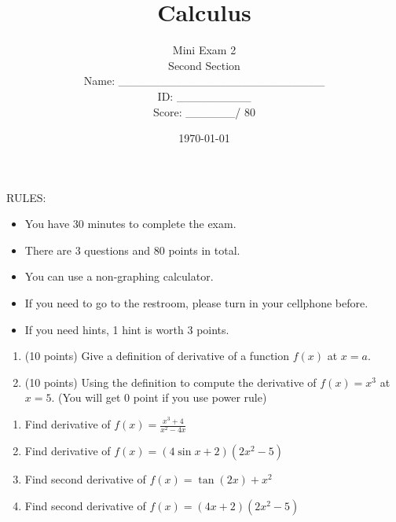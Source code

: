 \documentclass[12pt]{amsart}
\title{ Calculus }
\author{  Mini Exam 2 \\ Second Section \\ \vspace{1cm} Name: \_\_\_\_\_\_\_\_\_\_\_\_\_\_\_\_\_\_\_\_\_\_\_\_\_  
\\ \vspace{1cm} ID: \_\_\_\_\_\_\_\_\_ \\ \vspace{1cm} Score: \_\_\_\_\_\_/ 80}
\date{\today}
\begin{document}
\maketitle


RULES:
\begin{itemize}
	\item You have 30 minutes to complete the exam.
	\item There are 3 questions and 80 points in total.
	\item You can use a non-graphing calculator.
	\item If you need to go to the restroom, please turn in your cellphone before.
	\item If you need hints, 1 hint is worth 3 points.
\end{itemize}


\newpage

\begin{problem}[20 points]
\begin{enumerate}
	\item (10 points) Give a definition of derivative of a function $f(x)$ at $x = a$.
	      \vspace{9cm}
	\item (10 points) Using the definition to compute the derivative of $f(x) = x^3$ at $x = 5$.
	      (You will get 0 point if you use power rule)
	      \vspace{9cm}
\end{enumerate}
\end{problem}

\newpage

\begin{problem}[20 points]
\begin{enumerate}
	\item Find derivative of $\displaystyle f(x) = \frac{x^3 + 4}{x^2 - 4x}$
	      \vspace{10cm}
	\item Find derivative of $\displaystyle f(x) = (4\sin x + 2)(2x^2 - 5)$
	      \vspace{10cm}
	\item Find second derivative of $\displaystyle f(x) = \tan (2x)+ x^2$
	      \vspace{10cm}
	\item Find second derivative of $\displaystyle f(x) = (4x+ 2)(2x^2 - 5)$
	      \vspace{10cm}
\end{enumerate}
\end{problem}
\end{document}
